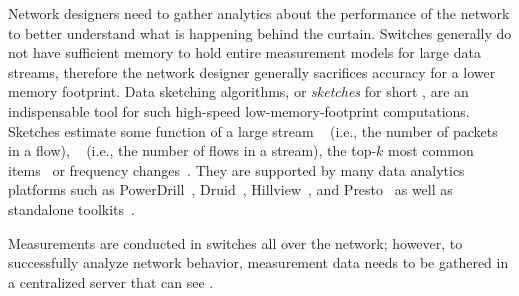 Network designers need to gather analytics about the performance of the network to better understand what is happening behind the curtain. 
 Switches generally do not have sufficient memory to hold entire measurement models for large data streams, therefore the network designer generally sacrifices accuracy for a lower memory footprint.
Data sketching algorithms, or \textit{sketches} for short \cite{cormode2012synopses}, are
an indispensable tool for such high-speed low-memory-footprint computations. Sketches  estimate some function
of a large stream  ~\cite{CountMin} (i.e., the number of packets in a flow), ~\cite{datar2002comparing, flajolet1983probabilistic} (i.e., the number of flows in a stream), the top-$k$ most common items~\cite{metwally2005efficient} or  frequency changes~\cite{IMCBal03}.
They are supported by many data analytics platforms such as PowerDrill~\cite{heule2013hyperloglog},
Druid~\cite{druid}, Hillview~\cite{hillview}, and Presto~\cite{presto} as well as  standalone toolkits~\cite{apache-datasketches}.


Measurements are conducted in switches  all over the network; however, to successfully analyze network behavior, measurement data needs to be gathered in a centralized server that can see .




